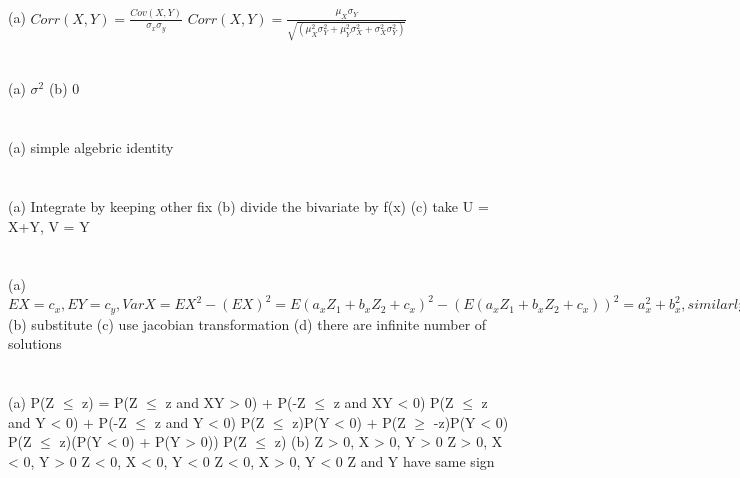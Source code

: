 \documentclass{report}
\begin{document}
\section{}
(a) $Corr(X, Y) = \frac{Cov(X, Y)}{\sigma_x\sigma_y}$
\newline
$Corr(X, Y) = \frac{\mu_X\sigma_Y}{\sqrt{(\mu_X^{2}\sigma_Y^{2} + \mu_Y^{2}\sigma_X^{2} + \sigma_X^{2}\sigma_Y^{2})}}$
\newline
\section{}
(a) $\sigma^2$
\newline
(b) $0$
\newline
\section{}
(a) simple algebric identity
\newline
\section{}
(a) Integrate by keeping other fix
\newline
(b) divide the bivariate by f(x)
\newline
(c) take U = X+Y, V = Y
\newline
\section{}
(a) $EX = c_x, EY = c_y, VarX = EX^2 - (EX)^2 = E(a_xZ_1 + b_xZ_2 + c_x)^2 - (E(a_xZ_1 + b_xZ_2 + c_x))^2 = a_x^2 + b_x^2, similarly for both of 2$
\newline
(b) substitute
\newline
(c) use jacobian transformation
\newline
(d) there are infinite number of solutions
\newline
\section{}
(a) P(Z $\le$ z) = P(Z $\le$ z and XY > 0) + P(-Z $\le$ z and XY < 0)
\newline
P(Z $\le$ z and Y < 0) + P(-Z $\le$ z and Y < 0)
\newline
P(Z $\le$ z)P(Y < 0) + P(Z $\ge$ -z)P(Y < 0)
\newline
P(Z $\le$ z)(P(Y < 0) + P(Y > 0))
\newline
P(Z $\le$ z)
\newline
(b) \newline
Z > 0, X > 0, Y > 0
\newline
Z > 0, X < 0, Y > 0
\newline
Z < 0, X < 0, Y < 0
\newline
Z < 0, X > 0, Y < 0
\newline
Z and Y have same sign
\newline
\end{document}
